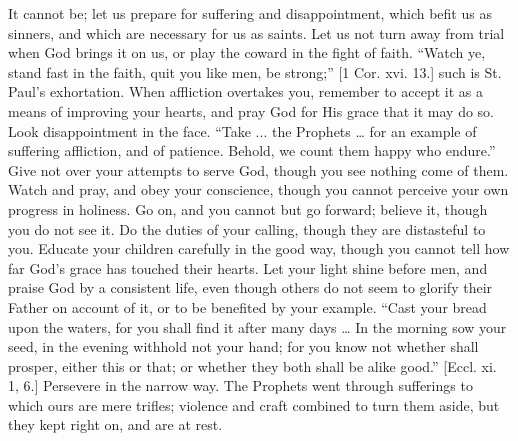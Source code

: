 It cannot be; let us prepare for suffering and disappointment,
which befit us as sinners, and which are necessary for us as saints.
Let us not turn away from trial when God brings it on us, or play the
coward in the fight of faith. ``Watch ye, stand fast in the faith,
quit you like men, be strong;'' [1 Cor. xvi. 13.] such is St.
Paul's exhortation. When affliction overtakes you, remember to accept
it as a means of improving your hearts, and pray God for His grace
that it may do so. Look disappointment in the face. ``Take ... the
Prophets … for an example of suffering affliction, and of patience.
Behold, we count them happy who endure.'' Give not over your
attempts to serve God, though you see nothing come of them. Watch and
pray, and obey your conscience, though you cannot perceive your own
progress in holiness. Go on, and you cannot but go forward; believe
it, though you do not see it. Do the duties of your calling, though
they are distasteful to you. Educate your children carefully in the
good way, though you cannot tell how far God's grace has touched their
hearts. Let your light shine before men, and praise God by a
consistent life, even though others do not seem to glorify their
Father on account of it, or to be benefited by your example.
``Cast your bread upon the waters, for you shall find it after
many days … In the morning sow your seed, in the evening withhold
not your hand; for you know not whether shall prosper, either this or
that; or whether they both shall be alike good.'' [Eccl. xi. 1,
6.] Persevere in the narrow way. The Prophets went through sufferings
to which ours are mere trifles; violence and craft combined to turn
them aside, but they kept right on, and are at rest.


